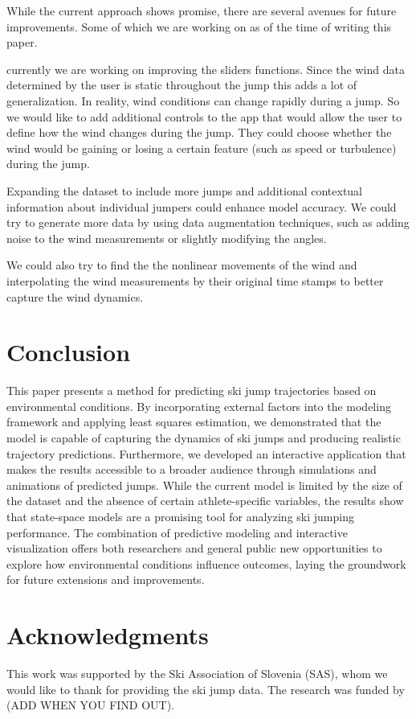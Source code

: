 \documentclass[sigconf,natbib=false, language=english]{acmart}
\begin{document}
While the current approach shows promise, there are several avenues for future
improvements. Some of which we are working on as of the time of writing this paper.

currently we are working on improving the sliders functions. Since the wind data 
determined by the user is static throughout the jump this adds a lot of generalization.
In reality, wind conditions can change rapidly during a jump. So we would like to
add additional controls to the app that would allow the user to define how the wind changes
during the jump. They could choose whether the wind would be gaining or losing a certain feature
(such as speed or turbulence) during the jump.

Expanding the dataset to include more jumps and additional contextual 
information about individual jumpers could enhance model accuracy. We could
try to generate more data by using data augmentation techniques, such as adding noise
to the wind measurements or slightly modifying the angles. 

We could also try to find the the nonlinear movements of the wind and interpolating
the wind measurements by their original time stamps to better capture the wind dynamics.


\section{Conclusion}\label{sec:conclusion}

This paper presents a method for predicting ski jump trajectories based on 
environmental conditions. By incorporating external factors into the modeling 
framework and applying least squares estimation, we demonstrated that the model 
is capable of capturing the dynamics of ski jumps and producing realistic 
trajectory predictions. Furthermore, we developed an interactive application 
that makes the results accessible to a broader audience through simulations and 
animations of predicted jumps. While the current model is limited by the size of the dataset 
and the absence of certain athlete-specific variables, the results 
show that state-space models are a promising tool for analyzing ski jumping 
performance. The combination of predictive modeling and interactive visualization 
offers both researchers and general public new opportunities to explore how 
environmental conditions influence outcomes, laying the groundwork for future 
extensions and improvements.

\section{Acknowledgments}
This work was supported by the Ski Association of Slovenia (SAS), whom we would like to thank
for providing the ski jump data. The research was funded by (ADD WHEN YOU FIND OUT). 

% 

\appendix

\printbibliography
\end{document}

